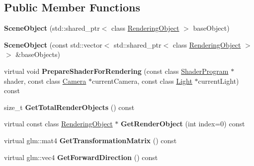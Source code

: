 \subsection*{Public Member Functions}
\begin{DoxyCompactItemize}
\item 
\hypertarget{class_scene_object_a9dd76f946c8e0743bed57f9499773fbd}{}{\bfseries Scene\+Object} (std\+::shared\+\_\+ptr$<$ class \hyperlink{class_rendering_object}{Rendering\+Object} $>$ base\+Object)\label{class_scene_object_a9dd76f946c8e0743bed57f9499773fbd}

\item 
\hypertarget{class_scene_object_aa89b21b4732296d196a76d1785aee02c}{}{\bfseries Scene\+Object} (const std\+::vector$<$ std\+::shared\+\_\+ptr$<$ class \hyperlink{class_rendering_object}{Rendering\+Object} $>$$>$ \&base\+Objects)\label{class_scene_object_aa89b21b4732296d196a76d1785aee02c}

\item 
\hypertarget{class_scene_object_a5ab56b2b2997f96aed97415185beec41}{}virtual void {\bfseries Prepare\+Shader\+For\+Rendering} (const class \hyperlink{class_shader_program}{Shader\+Program} $\ast$shader, const class \hyperlink{class_camera}{Camera} $\ast$current\+Camera, const class \hyperlink{class_light}{Light} $\ast$current\+Light) const \label{class_scene_object_a5ab56b2b2997f96aed97415185beec41}

\item 
\hypertarget{class_scene_object_ac2873f8a613bd4b161a1ea605888d6e7}{}size\+\_\+t {\bfseries Get\+Total\+Render\+Objects} () const \label{class_scene_object_ac2873f8a613bd4b161a1ea605888d6e7}

\item 
\hypertarget{class_scene_object_a29b15adf1faeceef0b3f5b1c36e34d5c}{}virtual const class \hyperlink{class_rendering_object}{Rendering\+Object} $\ast$ {\bfseries Get\+Render\+Object} (int index=0) const \label{class_scene_object_a29b15adf1faeceef0b3f5b1c36e34d5c}

\item 
\hypertarget{class_scene_object_aea26bf44c609cc4d733a811a55e442e2}{}virtual glm\+::mat4 {\bfseries Get\+Transformation\+Matrix} () const \label{class_scene_object_aea26bf44c609cc4d733a811a55e442e2}

\item 
\hypertarget{class_scene_object_abdf46a2b05799382e9cb3894d5da03ea}{}virtual glm\+::vec4 {\bfseries Get\+Forward\+Direction} () const \label{class_scene_object_abdf46a2b05799382e9cb3894d5da03ea}


\end{DoxyCompactItemize}
